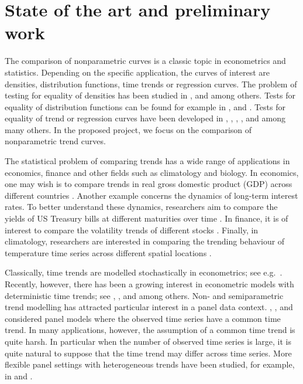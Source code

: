 \documentclass[a4paper,12pt]{article}
\begin{document}
\section{State of the art and preliminary work}\label{sec-intro}


The comparison of nonparametric curves is a classic topic in econometrics and statistics. Depending on the specific application, the curves of interest are densities, distribution functions, time trends or regression curves. The problem of testing for equality of densities has been studied in \cite{Mammen1992}, \cite{Anderson1994} and \cite{Li2009} among others. Tests for equality of distribution functions can be found for example in \cite{Kiefer1959}, \cite{Anderson1962} and \cite{Finner2018}. Tests for equality of trend or regression curves have been developed in \cite{HaerdleMarron1990}, \cite{Hall1990}, \cite{Delgado1993}, \cite{DegrasWu2012}, \cite{Zhang2012} and \cite{Hidalgo2014} among many others. In the proposed project, we focus on the comparison of nonparametric trend curves.


The statistical problem of comparing trends has a wide range of applications in economics, finance and other fields such as climatology and biology. In economics, one may wish is to compare trends in real gross domestic product (GDP) across different countries \citep[cp.][]{Grier1989}. Another example concerns the dynamics of long-term interest rates. To better understand these dynamics, researchers aim to compare the yields of US Treasury bills at different maturities over time \citep[cp.][]{Park2009}. In finance, it is of interest to compare the volatility trends of different stocks \citep[cp.][]{Nyblom2000}. Finally, in climatology, researchers are interested in comparing the trending behaviour of temperature time series across different spatial locations \citep[cp.][]{KarolyWu2005}. 


Classically, time trends are modelled stochastically in econometrics; see e.g.\ \cite{Stock1988}. Recently, however, there has been a growing interest in econometric models with deterministic time trends; see \cite{Cai2007}, \cite{Atak2011}, \cite{Robinson2012} and \cite{ChenGaoLi2012} among others. Non- and semiparametric trend modelling has attracted particular interest in a panel data context. \cite{LiChenGao2010}, \cite{Atak2011}, \cite{Robinson2012} and \cite{ChenGaoLi2012} considered panel models where the observed time series have a common time trend. In many applications, however, the assumption of a common time trend is quite harsh. In particular when the number of observed time series is large, it is quite natural to suppose that the time trend may differ across time series. More flexible panel settings with heterogeneous trends have been studied, for example, in \cite{Zhang2012} and \cite{Hidalgo2014}. 
\end{document}
